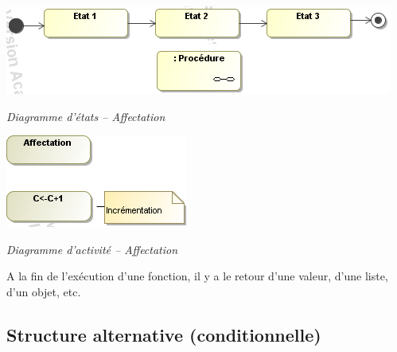 \documentclass[10pt,fleqn]{article} %
\begin{document}
\begin{minipage}[c]{.48\linewidth}
\begin{center}
\includegraphics[width=\textwidth]{images/Fonctions_stm}

\textit{Diagramme d'états -- Affectation}
\end{center}
\end{minipage} \hfill
\begin{minipage}[c]{.48\linewidth}
\begin{center}
\includegraphics[width=.7\textwidth]{images/Affectation_act}

\textit{Diagramme d'activité -- Affectation}
\end{center}
\end{minipage}


A la fin de l’exécution d’une fonction, il y a le retour d’une valeur, d’une liste, d’un objet, etc.
\subsection{Structure alternative (conditionnelle)}
\end{document}
